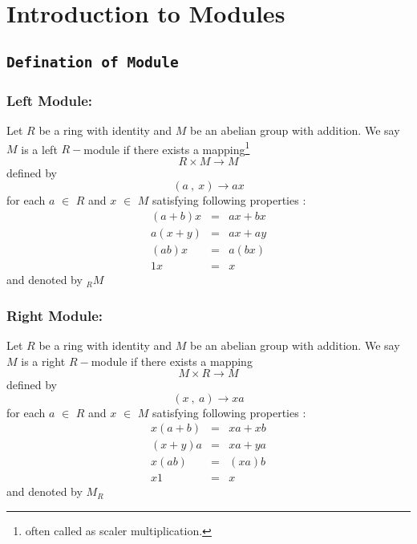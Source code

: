 \chapter{Introduction to Modules}
\section{\texttt{Defination of Module}}
\subsection{Left Module:}\label{sec:left-module}
 Let $ R $ be a ring with identity and $ M $ be an abelian group with addition. We say $ M $ is a left $R-$module if there exists a mapping\footnote{often called as scaler multiplication.}
\begin{equation*}
R \times M \rightarrow M
\end{equation*}	
defined by 
\begin{equation*}
(a \ , \ x) \rightarrow ax  
\end{equation*}
for each $a$ $\in$ $R$ and $x$ $\in$ $M$ satisfying following properties :
\begin{eqnarray}
(a+b) x &=& ax + bx\label{1} \\ a(x+y) &=& ax + ay\label{2} \\ (ab)x &=& a(bx)\label{3} \\ 1x &=& x\label{4}
\end{eqnarray}
and denoted by $_{R}M$
\subsection{Right Module:}\label{sec:right-module}
Let $ R $ be a ring with identity and $ M $ be an abelian group with addition. We say $ M $ is a right $R-$module if there exists a mapping
\begin{equation*}
M \times R \rightarrow M
\end{equation*}	
defined by 
\begin{equation*}
(x \ ,\ a) \rightarrow xa  
\end{equation*}
for each $a$ $\in$ $R$ and $x$ $\in$ $M$ satisfying following properties :
\begin{eqnarray}
x (a+b)  &=& xa + xb\label{5} \\ (x+y) a &=& xa + ya\label{6} \\ x (ab) &=& (xa)b\label{7} \\ x1 &=& x\label{8}
\end{eqnarray}
and denoted by $M_{R}$

